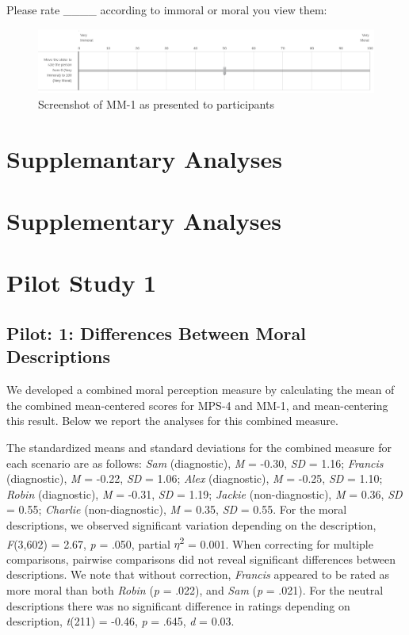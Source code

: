 \documentclass[
  american,
  man,floatsintext]{apa7}
\begin{document}
Please rate \_\_\_\_ according to immoral or moral you view them:

\begin{figure}
\centering
\includegraphics{../resources/images/mm1.png}
\caption{Screenshot of MM-1 as presented to participants}
\end{figure}

\newpage

\hypertarget{supplemantary-analyses}{%
\section{Supplemantary Analyses}\label{supplemantary-analyses}}

\hypertarget{supplementary-analyses}{%
\section{Supplementary Analyses}\label{supplementary-analyses}}

\hypertarget{pilot-study-1}{%
\section{Pilot Study 1}\label{pilot-study-1}}

\hypertarget{pilot-1-differences-between-moral-descriptions}{%
\subsection{Pilot: 1: Differences Between Moral Descriptions}\label{pilot-1-differences-between-moral-descriptions}}

We developed a combined moral perception measure by calculating the mean of the combined mean-centered scores for MPS-4 and MM-1, and mean-centering this result. Below we report the analyses for this combined measure.

The standardized means and standard deviations for the combined measure for each scenario are as follows:
\emph{Sam} (diagnostic),
\emph{M} = -0.30, \emph{SD} = 1.16;
\emph{Francis} (diagnostic),
\emph{M} = -0.22, \emph{SD} = 1.06;
\emph{Alex} (diagnostic),
\emph{M} = -0.25, \emph{SD} = 1.10;
\emph{Robin} (diagnostic),
\emph{M} = -0.31, \emph{SD} = 1.19;
\emph{Jackie} (non-diagnostic),
\emph{M} = 0.36, \emph{SD} = 0.55;
\emph{Charlie} (non-diagnostic),
\emph{M} = 0.35, \emph{SD} = 0.55. For the moral descriptions, we observed significant variation depending on the description, \emph{F}(3,602) = 2.67, \emph{p} = .050, partial \(\eta\)\textsuperscript{2} = 0.001. When correcting for multiple comparisons, pairwise comparisons did not reveal significant differences between descriptions. We note that without correction, \emph{Francis} appeared to be rated as more moral than both \emph{Robin} (\emph{p} = .022), and \emph{Sam} (\emph{p} = .021). For the neutral descriptions there was no significant difference in ratings depending on description, \emph{t}(211) = -0.46, \emph{p} = .645, \emph{d} = 0.03.
\end{document}
